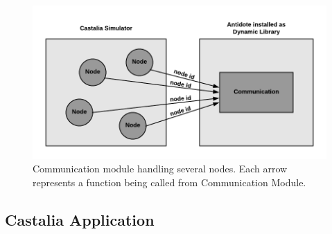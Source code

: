 \begin{figure}[htbp]
\centerline{\includegraphics[scale=0.7]{figures/communicationModuleCastalia.png}}
\caption{Communication module handling several nodes. Each arrow represents a function being called from Communication Module.}
\label{fig:communicationModuleCastalia}
\end{figure}

\subsection{Castalia Application}